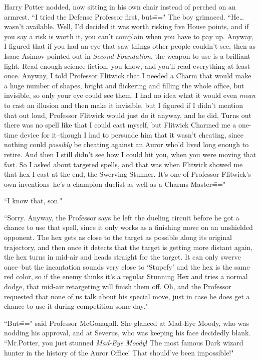 Harry Potter nodded, now sitting in his own chair instead of perched on an armrest. ``I tried the Defense Professor first, but\===" The boy grimaced. ``He{\ldots} wasn't available. Well, I'd decided it was worth risking five House points, and if you say a risk is worth it, you can't complain when you have to pay up. Anyway, I figured that if you had an eye that saw things other people couldn't see, then as Isaac Asimov pointed out in \emph{Second Foundation}, the weapon to use is a brilliant light. Read enough science fiction, you know, and you'll read everything at least once. Anyway, I told Professor Flitwick that I needed a Charm that would make a huge number of shapes, bright and flickering and filling the whole office, but invisible, so only your eye could see them. I had no idea what it would even \emph{mean} to cast an illusion and then make it invisible, but I figured if I didn't mention that out loud, Professor Flitwick would just do it anyway, and he did. Turns out there was no spell like that I could cast myself, but Flitwick Charmed me a one-time device for it\---though I had to persuade him that it wasn't cheating, since nothing could \emph{possibly} be cheating against an Auror who'd lived long enough to retire. And then I still didn't see how I could hit you, when you were moving that fast. So I asked about targeted spells, and that was when Flitwick showed me that hex I cast at the end, the Swerving Stunner. It's one of Professor Flitwick's own inventions\---he's a champion duelist as well as a Charms Master\==="

``I know that, son."

``Sorry. Anyway, the Professor says he left the dueling circuit before he got a chance to use that spell, since it only works as a finishing move on an unshielded opponent. The hex gets as close to the target as possible along its original trajectory, and then once it detects that the target is getting more distant again, the hex turns in mid-air and heads straight for the target. It can only swerve once\---but the incantation sounds very close to `Stupefy' and the hex is the same red color, so if the enemy thinks it's a regular Stunning Hex and tries a normal dodge, that mid-air retargeting will finish them off. Oh, and the Professor requested that none of us talk about his special move, just in case he does get a chance to use it during competition some day."

``But\===" said Professor McGonagall. She glanced at Mad-Eye Moody, who was nodding his approval, and at Severus, who was keeping his face decidedly blank. ``Mr.\?Potter, you just stunned \emph{Mad-Eye Moody}! The most famous Dark wizard hunter in the history of the Auror Office! That should've been impossible!"

